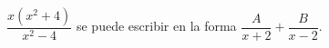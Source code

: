 \item $\dfrac{x(x^2 + 4)}{x^2 - 4}$ se puede escribir en la forma $\dfrac{A}{x + 2} + \dfrac{B}{x - 2}$.
